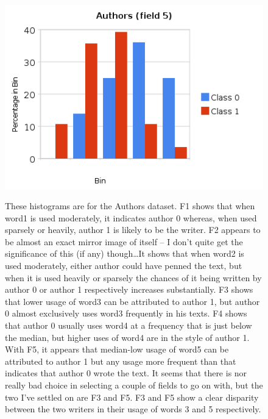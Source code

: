 \documentclass[a4paper,10pt]{article}
\begin{document}
        \begin{figure}[ht!]
          \begin{minipage}[t]{0.5\linewidth}
              \includegraphics[scale=0.45]{charts/AuthorsPics/A5.png}
          \end{minipage}
          \parbox[b]{3.5in}{
            These histograms are for the Authors dataset. F1 shows that when word1 is used moderately, it indicates author 0
            whereas, when used sparsely or heavily, author 1 is likely to be the writer. F2 appears to be almost an exact
            mirror image of itself -- I don't quite get the significance of this (if any) though\ldots It shows that
            when word2 is used moderately, either author could have penned the text, but when it is used heavily or sparsely
            the chances of it being written by author 0 or author 1 respectively increases substantially. F3 shows that
            lower usage of word3 can be attributed to author 1, but author 0 almost exclusively uses word3 frequently in his
            texts. F4 shows that author 0 usually uses word4 at a frequency that is just below the median, but higher uses of
            word4 are in the style of author 1. With F5, it appears that median-low usage of word5 can be attributed to 
            author 1 but any usage more frequent than that indicates that author 0 wrote the text. It seems that there is
            nor really bad choice in selecting a couple of fields to go on with, but the two I've settled on are F3 and F5.
            F3 and F5 show a clear disparity between the two writers in their usage of words 3 and 5 respectively.   
          }
        \end{figure}

        \newpage
 
\end{document}
